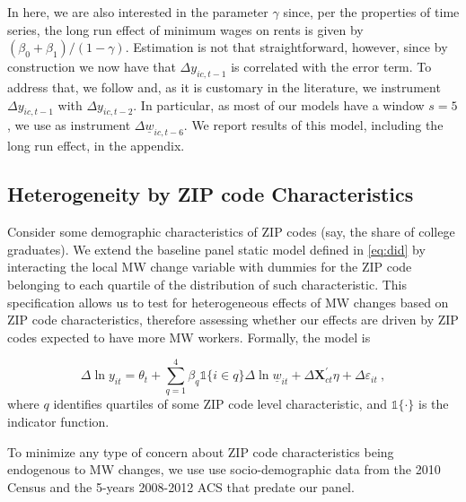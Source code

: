 In here, we are also interested in the parameter $\gamma$ since, per the properties of time
series, the long run effect of minimum wages on rents is given by 
$(\beta_0 + \beta_1)/(1-\gamma)$. %
Estimation is not that straightforward, however, since by construction we now have that 
$\Delta y_{ic,t-1}$ is correlated with the error term. To address that,  we follow 
\textcite{ArellanoBond1991} %
and, as it is customary in the literature, we instrument $\Delta y_{ic,t-1}$ with $\Delta 
y_{ic,t-2}$. In particular, as most of our models have a window $s=5$, we use as instrument 
$\Delta \underline{w}_{ic,t-6}$. We report results of this model, including the long run
effect, in the appendix.

\subsection{Heterogeneity by ZIP code Characteristics}\label{sec:strategy_heterogeneity}

Consider some demographic characteristics of ZIP codes (say, the share of college graduates).
We extend the baseline panel static model defined in \autoref{eq:did} by interacting the 
local MW change variable with dummies for the ZIP code belonging to each quartile of the 
distribution of such characteristic. This specification allows us to test for heterogeneous 
effects of MW changes based on ZIP code characteristics, therefore assessing whether our effects 
are driven by ZIP codes expected to have more MW workers. Formally, the model is

\begin{equation}\label{eq:diff_main_hetero} 
    \Delta \ln y_{it} = \theta_t 
    				+ \sum_{q = 1}^4 \beta_q \mathds{1}\{i \in q\} \Delta \ln \underline{w}_{it}
    				+ \Delta \mathbf{X}^{'}_{ct}\eta
    				+ \Delta \varepsilon_{it} \ ,
\end{equation}
where $q$ identifies quartiles of some ZIP code level characteristic, and $\mathds{1}\{ \cdot \}$ 
is the indicator function.

To minimize any type of concern about ZIP code characteristics being endogenous to MW changes, 
we use use socio-demographic data from the 2010 Census and the 5-years 2008-2012 ACS that 
predate our panel.


